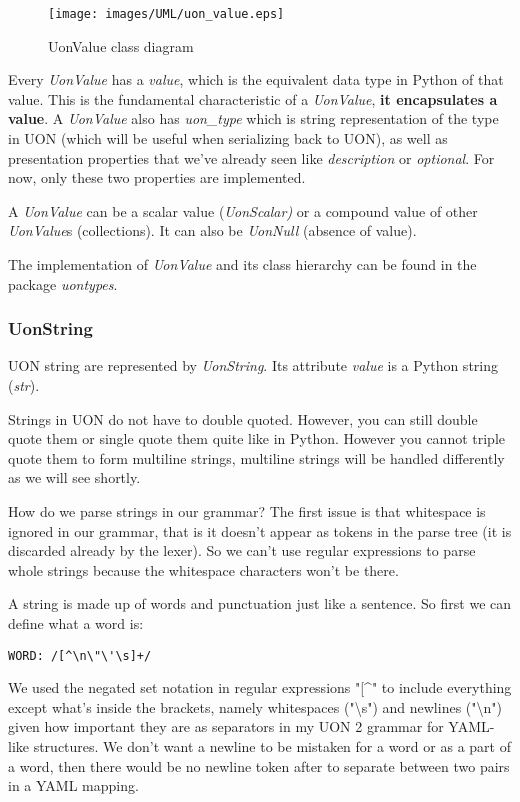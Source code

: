 \documentclass[12pt]{article}
\begin{document}
\begin{figure}[ht!]
 	\centering
 	\caption{UonValue class diagram}
 	\texttt{[image: images/UML/uon\_value.eps]}
 	\label{fig:uon_value_uml}
\end{figure}

Every \emph{UonValue} has a \emph{value}, which is the equivalent data type in Python of that value. This is the fundamental characteristic of a \emph{UonValue}, \textbf{it encapsulates a value}. A \emph{UonValue} also has \emph{uon\_type} which is string representation of the type in UON (which will be useful when serializing back to UON),  as well as presentation properties that we've already seen like \emph{description} or \emph{optional}. For now, only these two properties are implemented.

A \emph{UonValue} can be a scalar value (\emph{UonScalar)} or a compound value of other \emph{UonValue}s (collections). It can also be \emph{UonNull} (absence of value).

The implementation of \emph{UonValue} and its class hierarchy can be found in the package \emph{uontypes}.

\pagebreak

\subsubsection{UonString}
UON string are represented by \emph{UonString}. Its attribute \emph{value} is a Python string (\emph{str}). 

Strings in UON do not have to double quoted. However, you can still double quote them or single quote them quite like in Python. However you cannot triple quote them to form multiline strings, multiline strings will be handled differently as we will see shortly.

How do we parse strings in our grammar? The first issue is that whitespace is ignored in our grammar, that is it doesn't appear as tokens in the parse tree (it is discarded already by the lexer). So we can't use regular expressions to parse whole strings because the whitespace characters won't be there.

A string is made up of words and punctuation just like a sentence. So first we can define what a word is:

\begin{lstlisting}[label={grammar:word}]
WORD: /[^\n\"\'\s]+/
\end{lstlisting}

We used the negated set notation in regular expressions "[\textasciicircum" to include everything except what's inside the brackets, namely whitespaces ("\textbackslash s") and newlines ("\textbackslash n") given how important they are as separators in my UON 2 grammar for YAML-like structures. We don't want a newline to be mistaken for a word or as a part of a word, then there would be no newline token after to separate between two pairs in a YAML mapping.
\end{document}
